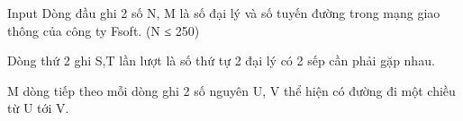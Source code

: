Input
Dòng đầu ghi 2 số N, M là số đại lý và số tuyến đường trong mạng giao thông của công ty Fsoft. (N ≤ 250)

Dòng thứ 2 ghi S,T lần lượt là số thứ tự 2 đại lý có 2 sếp cần phải gặp nhau.

M dòng tiếp theo mỗi dòng ghi 2 số nguyên U, V thể hiện có đường đi một chiều từ U tới V.